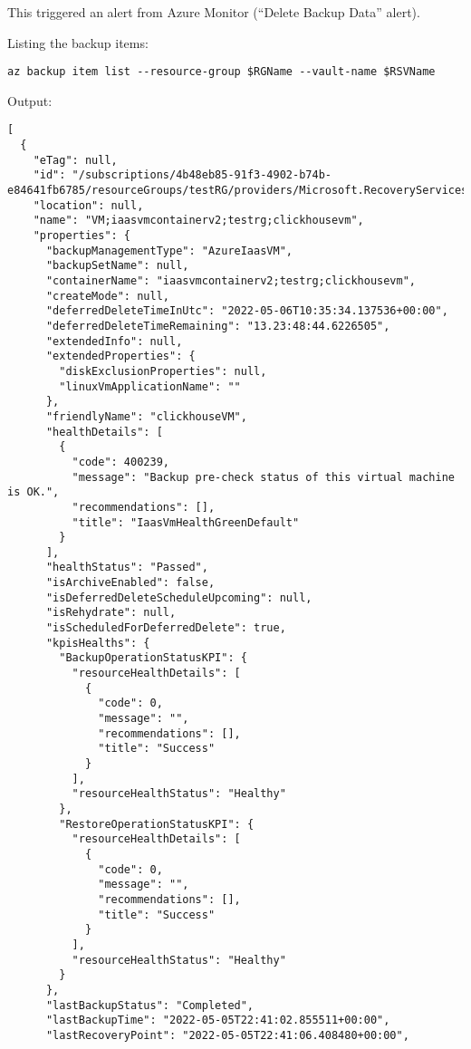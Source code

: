 This triggered an alert from Azure Monitor (``Delete Backup Data'' alert).

Listing the backup items:
\begin{verbatim}
az backup item list --resource-group $RGName --vault-name $RSVName
\end{verbatim}

Output:
\begin{verbatim}
[
  {
    "eTag": null,
    "id": "/subscriptions/4b48eb85-91f3-4902-b74b-e84641fb6785/resourceGroups/testRG/providers/Microsoft.RecoveryServices/vaults/myRSV/backupFabrics/Azure/protectionContainers/IaasVMContainer;iaasvmcontainerv2;testrg;clickhousevm/protectedItems/VM;iaasvmcontainerv2;testrg;clickhousevm",
    "location": null,
    "name": "VM;iaasvmcontainerv2;testrg;clickhousevm",
    "properties": {
      "backupManagementType": "AzureIaasVM",
      "backupSetName": null,
      "containerName": "iaasvmcontainerv2;testrg;clickhousevm",
      "createMode": null,
      "deferredDeleteTimeInUtc": "2022-05-06T10:35:34.137536+00:00",
      "deferredDeleteTimeRemaining": "13.23:48:44.6226505",
      "extendedInfo": null,
      "extendedProperties": {
        "diskExclusionProperties": null,
        "linuxVmApplicationName": ""
      },
      "friendlyName": "clickhouseVM",
      "healthDetails": [
        {
          "code": 400239,
          "message": "Backup pre-check status of this virtual machine is OK.",
          "recommendations": [],
          "title": "IaasVmHealthGreenDefault"
        }
      ],
      "healthStatus": "Passed",
      "isArchiveEnabled": false,
      "isDeferredDeleteScheduleUpcoming": null,
      "isRehydrate": null,
      "isScheduledForDeferredDelete": true,
      "kpisHealths": {
        "BackupOperationStatusKPI": {
          "resourceHealthDetails": [
            {
              "code": 0,
              "message": "",
              "recommendations": [],
              "title": "Success"
            }
          ],
          "resourceHealthStatus": "Healthy"
        },
        "RestoreOperationStatusKPI": {
          "resourceHealthDetails": [
            {
              "code": 0,
              "message": "",
              "recommendations": [],
              "title": "Success"
            }
          ],
          "resourceHealthStatus": "Healthy"
        }
      },
      "lastBackupStatus": "Completed",
      "lastBackupTime": "2022-05-05T22:41:02.855511+00:00",
      "lastRecoveryPoint": "2022-05-05T22:41:06.408480+00:00",

\end{verbatim}
